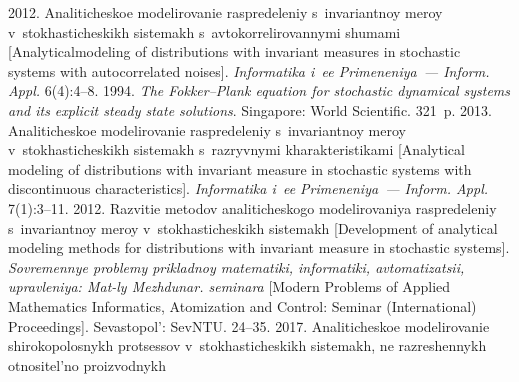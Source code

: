   


  \begin{multicols}{2}

\renewcommand{\bibname}{\protect\rmfamily References}

{\small\frenchspacing
 {%
 \begin{thebibliography}{99} 
 
 
 2012. Analiticheskoe modelirovanie ras\-predeleniy s~invariantnoy meroy v~sto\-kha\-sti\-che\-skikh sis\-temakh s~av\-to\-kor\-re\-li\-ro\-van\-ny\-mi shu\-ma\-mi 
 [Analytical\linebreak modeling of distributions with invariant measures in stochastic systems with autocorrelated noises]. 
 \textit{Informatika i~ee Primeneniya~--- Inform. Appl.} 6(4):4--8.
 1994. 
 \textit{The Fokker--Plank equation for stochastic dynamical systems and its explicit steady state solutions}. Singapore: World Scientific. 321~p.
 2013. Analiticheskoe modelirovanie raspredeleniy s~invariantnoy meroy v~sto\-kha\-sti\-che\-skikh sis\-te\-makh 
s~razryvnymi kharakteristikami [Analytical modeling of distributions with invariant measure in stochastic systems with discontinuous characteristics]. 
 \textit{Informatika i~ee Primeneniya~--- Inform. Appl.} 7(1):3--11.
 2012. 
Razvitie metodov ana\-li\-ti\-che\-sko\-go mo\-de\-li\-ro\-va\-niya ras\-pre\-de\-le\-niy s~in\-va\-ri\-ant\-noy me\-roy v~sto\-kha\-sti\-che\-skikh sis\-te\-makh 
[Development of analytical modeling methods for distributions with invariant measure in stochastic systems].
 \textit{Sovremennye problemy pri\-klad\-noy ma\-te\-ma\-ti\-ki, informatiki, avtomatizatsii, upravleniya: Mat-ly Mezhdunar. seminara}
  [Modern Problems of Applied Mathematics Informatics, Atomization and Control: Seminar (International) Proceedings]. Sevastopol': SevNTU. 24--35.
 2017. Ana\-li\-ti\-che\-skoe mo\-de\-li\-ro\-va\-nie shi\-ro\-ko\-po\-los\-nykh pro\-tses\-sov 
v~sto\-kha\-sti\-che\-skikh sis\-te\-makh, ne raz\-re\-shen\-nykh ot\-no\-si\-tel'\-no pro\-iz\-vod\-nykh 

\end{thebibliography}}}
\end{multicols}
